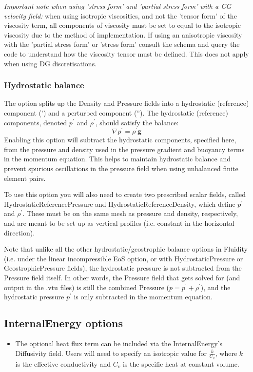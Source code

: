 \emph{Important note when using 'stress form' and 'partial stress form' with a CG velocity field:} when using isotropic viscosities, and not the 'tensor form' of the viscosity term, all components of viscosity must be set to equal to the isotropic viscosity due to the method of implementation. If using an anisotropic viscosity with the 'partial stress form' or 'stress form' consult the schema and query the code to understand how the viscosity tensor must be defined. This does not apply when using DG discretisations.

\subsubsection{Hydrostatic balance}
The option  splits up the Density and Pressure fields into a hydrostatic (reference) component (') and a perturbed component (''). The hydrostatic (reference) components, denoted $p^{\prime}$ and $\rho^{\prime}$, should satisfy the balance:
\begin{equation}
  \nabla p^{\prime} = \rho^{\prime}\mathbf{g}
\end{equation}
Enabling this option will subtract the hydrostatic components, specified here, from the pressure and density used in the pressure gradient and buoyancy terms in the momentum equation. This helps to maintain hydrostatic balance and prevent spurious oscillations in the pressure field when using unbalanced finite element pairs.

To use this option you will also need to create two prescribed scalar fields, called HydrostaticReferencePressure and HydrostaticReferenceDensity, which define $p^{\prime}$ and $\rho^{\prime}$. These must be on the same mesh as pressure and density, respectively, and are meant to be set up as vertical profiles (i.e. constant in the horizontal direction).

Note that unlike all the other hydrostatic/geostrophic balance options in Fluidity (i.e.  under the linear incompressible EoS option, or with HydrostaticPressure or GeostrophicPressure fields), the hydrostatic pressure is not subtracted from the Pressure field itself. In other words, the Pressure field that gets solved for (and output in the .vtu files) is still the combined Pressure ($p = p^{\prime} + \rho^{\prime}$), and the hydrostatic pressure $p^{\prime}$ is only subtracted in the momentum equation.

\subsection{InternalEnergy options}
\begin{itemize}
\item The optional heat flux term can be included via the InternalEnergy's Diffusivity field. Users will need to specify an isotropic value for $\frac{k}{C_v}$, where $k$ is the effective conductivity and $C_v$ is the specific heat at constant volume.
\end{itemize}

